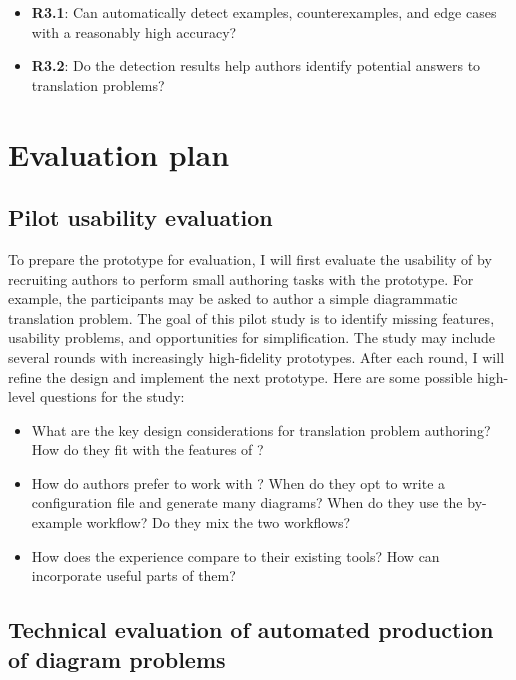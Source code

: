 \begin{itemize}
    \item \textbf{R3.1}: Can \Edgeworth automatically detect examples, counterexamples, and edge cases with a reasonably high accuracy?
    \item \textbf{R3.2}: Do the detection results help authors identify potential answers to translation problems?
\end{itemize}

\section{Evaluation plan}

\subsection{Pilot usability evaluation}

To prepare the \Edgeworth prototype for evaluation, I will first evaluate the usability of \Edgeworth by recruiting authors to perform small authoring tasks with the \Edgeworth prototype. For example, the participants may be asked to author a simple diagrammatic translation problem. The goal of this pilot study is to identify missing features, usability problems, and opportunities for simplification. The study may include several rounds with increasingly high-fidelity prototypes. After each round, I will refine the design and implement the next prototype. Here are some possible high-level questions for the study:
\begin{itemize}
    \item What are the key design considerations for translation problem authoring? How do they fit with the features of \Edgeworth?
    \item How do authors prefer to work with \Edgeworth? When do they opt to write a configuration file and generate many diagrams? When do they use the by-example workflow? Do they mix the two workflows?
    \item How does the experience compare to their existing tools? How can \Edgeworth incorporate useful parts of them? 
\end{itemize}

\subsection{Technical evaluation of automated production of diagram problems}
\label{sec:case-study}


